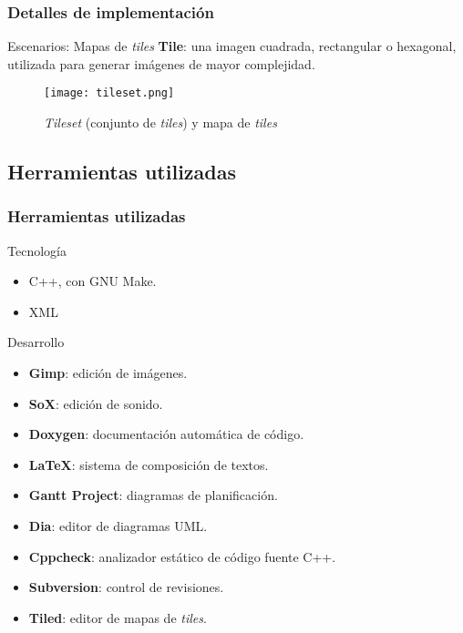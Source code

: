 \begin{frame}
\frametitle{Detalles de implementación}
	\begin{block}{Escenarios: Mapas de \textit{tiles}}
		\noindent \textbf{Tile}: una imagen cuadrada, rectangular o hexagonal, utilizada para generar imágenes de mayor complejidad.
	\end{block}
	\begin{figure}[H]
		\label{tileset}
		\begin{center}
		\texttt{[image: tileset.png]}
		\end{center}
		\caption{\textit{Tileset} (conjunto de \textit{tiles}) y mapa de \textit{tiles}}
	\end{figure}
\end{frame}

\subsection{Herramientas utilizadas}

\begin{frame}
\frametitle{Herramientas utilizadas}
	\begin{block}{Tecnología}
		\begin{itemize}
			\item C++, con GNU Make.
			\item XML
		\end{itemize}
	\end{block}
	\begin{block}{Desarrollo}
		\begin{itemize}
			\item \textbf{Gimp}: edición de imágenes.
			\item \textbf{SoX}: edición de sonido.
			\item \textbf{Doxygen}: documentación automática de código.
			\item \textbf{\LaTeX}: sistema de composición de textos.
			\item \textbf{Gantt Project}: diagramas de planificación.
			\item \textbf{Dia}: editor de diagramas UML.
			\item \textbf{Cppcheck}: analizador estático de código fuente C++.
			\item \textbf{Subversion}: control de revisiones.
			\item \textbf{Tiled}: editor de mapas de \textit{tiles}.
		\end{itemize}
	\end{block}
\end{frame}

